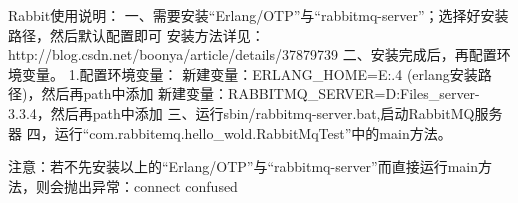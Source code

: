 Rabbit使用说明：
一、需要安装“Erlang/OTP”与“rabbitmq-server”；选择好安装路径，然后默认配置即可
安装方法详见：http://blog.csdn.net/boonya/article/details/37879739
二、安装完成后，再配置环境变量。
1.配置环境变量：
新建变量：ERLANG_HOME=E:\java\RabbitMq{}.4  (erlang安装路径)，然后再path中添加%
新建变量：RABBITMQ_SERVER=D:\Program Files\rabbitmq_server-3.3.4，然后再path中添加%
三、运行sbin/rabbitmq-server.bat,启动RabbitMQ服务器
四，运行“com.rabbitemq.hello_wold.RabbitMqTest”中的main方法。

注意：若不先安装以上的“Erlang/OTP”与“rabbitmq-server”而直接运行main方法，则会抛出异常：connect confused

